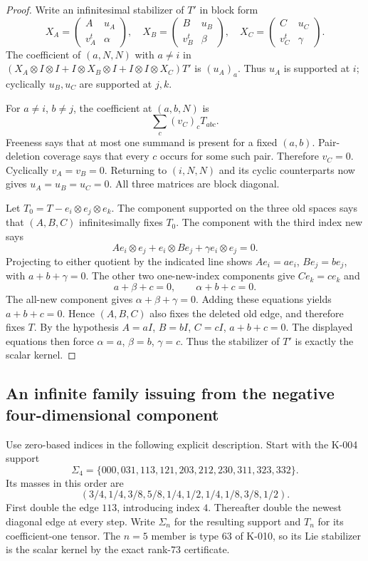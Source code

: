 \begin{proof}
Write an infinitesimal stabilizer of $T'$ in block form
\[
 X_A=\begin{pmatrix}A&u_A\\v_A^t&\alpha\end{pmatrix},\quad
 X_B=\begin{pmatrix}B&u_B\\v_B^t&\beta\end{pmatrix},\quad
 X_C=\begin{pmatrix}C&u_C\\v_C^t&\gamma\end{pmatrix}.
\]
The coefficient of $(a,N,N)$ with $a\ne i$ in
$(X_A\otimes I\otimes I+I\otimes X_B\otimes I+
I\otimes I\otimes X_C)T'$ is $(u_A)_a$.  Thus $u_A$ is supported
at $i$; cyclically $u_B,u_C$ are supported at $j,k$.

For $a\ne i$, $b\ne j$, the coefficient at $(a,b,N)$ is
\[
                  \sum_c (v_C)_c T_{abc}.
\]
Freeness says that at most one summand is present for a fixed
$(a,b)$.  Pair-deletion coverage says that every $c$ occurs for
some such pair.  Therefore $v_C=0$.  Cyclically $v_A=v_B=0$.
Returning to $(i,N,N)$ and its cyclic counterparts now gives
$u_A=u_B=u_C=0$.  All three matrices are block diagonal.

Let $T_0=T-e_i\otimes e_j\otimes e_k$.  The component supported
on the three old spaces says that $(A,B,C)$ infinitesimally fixes
$T_0$.  The component with the third index new says
\[
 Ae_i\otimes e_j+e_i\otimes Be_j+\gamma e_i\otimes e_j=0.
\]
Projecting to either quotient by the indicated line shows
$Ae_i=ae_i$, $Be_j=be_j$, with $a+b+\gamma=0$.
The other two one-new-index components give $Ce_k=ce_k$ and
\[
 a+\beta+c=0,\qquad \alpha+b+c=0.
\]
The all-new component gives $\alpha+\beta+\gamma=0$.
Adding these equations yields $a+b+c=0$.  Hence $(A,B,C)$ also
fixes the deleted old edge, and therefore fixes $T$.  By the
hypothesis $A=aI$, $B=bI$, $C=cI$, $a+b+c=0$.  The displayed
equations then force $\alpha=a$, $\beta=b$, $\gamma=c$.
Thus the stabilizer of $T'$ is exactly the scalar kernel.
\end{proof}

\subsection*{An infinite family issuing from the negative four-dimensional component}
Use zero-based indices in the following explicit description.  Start
with the K-004 support
\[
 \Sigma_4=\{000,031,113,121,203,212,230,311,323,332\}.
\]
Its masses in this order are
\[
 (3/4,1/4,3/8,5/8,1/4,1/2,1/4,1/8,3/8,1/2).
\]
First double the edge $113$, introducing index $4$.
Thereafter double the newest diagonal edge at every step.  Write
$\Sigma_n$ for the resulting support and $T_n$ for its coefficient-one
tensor.  The $n=5$ member is type $63$ of K-010, so its Lie
stabilizer is the scalar kernel by the exact rank-$73$ certificate.

